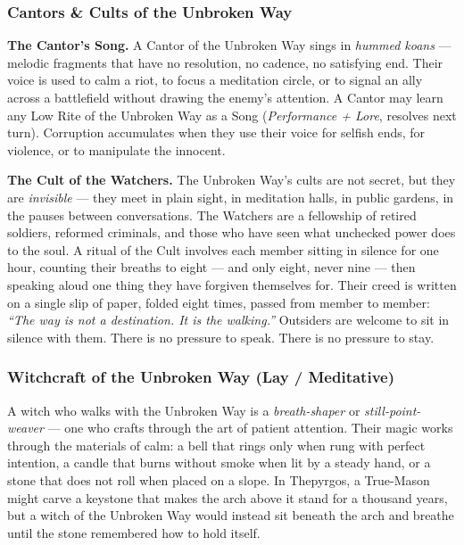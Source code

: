 \subsubsection*{Cantors \& Cults of the Unbroken Way}

\textbf{The Cantor's Song.} A Cantor of the Unbroken Way sings in \textit{hummed koans} --- melodic fragments that have no resolution, no cadence, no satisfying end. Their voice is used to calm a riot, to focus a meditation circle, or to signal an ally across a battlefield without drawing the enemy's attention. A Cantor may learn any Low Rite of the Unbroken Way as a Song (\textit{Performance + Lore}, resolves next turn). Corruption accumulates when they use their voice for selfish ends, for violence, or to manipulate the innocent.

\textbf{The Cult of the Watchers.} The Unbroken Way's cults are not secret, but they are \textit{invisible} --- they meet in plain sight, in meditation halls, in public gardens, in the pauses between conversations. The Watchers are a fellowship of retired soldiers, reformed criminals, and those who have seen what unchecked power does to the soul. A ritual of the Cult involves each member sitting in silence for one hour, counting their breaths to eight --- and only eight, never nine --- then speaking aloud one thing they have forgiven themselves for. Their creed is written on a single slip of paper, folded eight times, passed from member to member: \textit{``The way is not a destination. It is the walking.''} Outsiders are welcome to sit in silence with them. There is no pressure to speak. There is no pressure to stay.

\subsubsection*{Witchcraft of the Unbroken Way (Lay / Meditative)}

A witch who walks with the Unbroken Way is a \textit{breath-shaper} or \textit{still-point-weaver} --- one who crafts through the art of patient attention. Their magic works through the materials of calm: a bell that rings only when rung with perfect intention, a candle that burns without smoke when lit by a steady hand, or a stone that does not roll when placed on a slope. In Thepyrgos, a True-Mason might carve a keystone that makes the arch above it stand for a thousand years, but a witch of the Unbroken Way would instead sit beneath the arch and breathe until the stone remembered how to hold itself.

